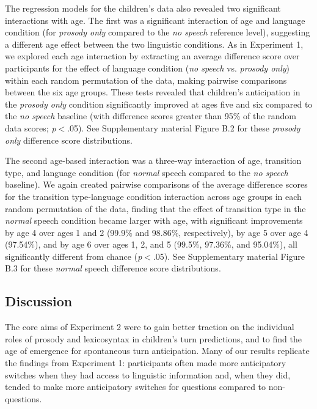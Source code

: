 \documentclass[authoryear, 12pt]{elsarticle}
\begin{document}
The regression models for the children's data also revealed two significant interactions with age. The first was a significant interaction of age and language condition (for \textit{prosody only} compared to the \textit{no speech} reference level), suggesting a different age effect between the two linguistic conditions. As in Experiment 1, we explored each age interaction by extracting an average difference score over participants for the effect of language condition (\textit{no speech} vs. \textit{prosody only}) within each random permutation of the data, making pairwise comparisons between the six age groups. These tests revealed that children's anticipation in the \textit{prosody only} condition significantly improved at ages five and six compared to the \textit{no speech} baseline (with difference scores greater than 95\% of the random data scores; \textit{p}$<$.05). See Supplementary material Figure B.2 for these \textit{prosody only} difference score distributions.

The second age-based interaction was a three-way interaction of age, transition type, and language condition (for \textit{normal} speech compared to the \textit{no speech} baseline). We again created pairwise comparisons of the average difference scores for the transition type-language condition interaction across age groups in each random permutation of the data, finding that the effect of transition type in the \textit{normal} speech condition became larger with age, with significant improvements by age 4 over ages 1 and 2 (99.9\% and 98.86\%, respectively), by age 5 over age 4 (97.54\%), and by age 6 over ages 1, 2, and 5 (99.5\%, 97.36\%, and 95.04\%), all significantly different from chance (\textit{p}$<$.05). See Supplementary material Figure B.3 for these \textit{normal} speech difference score distributions.

\subsection*{Discussion}
\label{sec:discussion2}

The core aims of Experiment 2 were to gain better traction on the individual roles of prosody and lexicosyntax in children's turn predictions, and to find the age of emergence for spontaneous turn anticipation. Many of our results replicate the findings from Experiment 1: participants often made more anticipatory switches when they had access to linguistic information and, when they did, tended to make more anticipatory switches for questions compared to non-questions.
\end{document}
